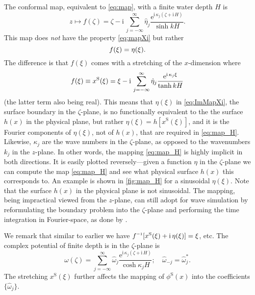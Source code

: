 \documentclass[a4paper,12pt]{article}
\newcommand{\mr}{\mathrm}
\renewcommand{\S}{^\mr{S}}
\newcommand{\ii}{\mr{i}\,}
\newcommand{\ee}{\mr{e}}
\renewcommand{\_}[1]{_\mr{#1}}
\let\Re\relax
\let\Im\relax
\DeclareMathOperator\Re{Re}
\DeclareMathOperator\Im{Im}
\newcommand{\h}{\hat}
\newcommand{\z}{z}
\newcommand{\x}{x}
\newcommand{\zz}{\zeta}
\newcommand{\xx}{\xi}
\newcommand{\kk}{\kappa}
\newcommand{\zmap}{f}
\newcommand{\zzmap}{\zmap^{\raisebox{.2ex}{$\scriptscriptstyle-1$}}}
\newcommand{\ww}{\omega}
\newcommand{\surf}{\eta}
\begin{document}
The conformal map, equivalent to \eqref{eq:map}, with a finite water depth $H$ is
\begin{equation}
z\mapsto \zmap(\zz) = \zz - \ii \sum_{j=-\infty}^\infty \h\eta_j \frac{\ee^{\ii \kk_j(\zz+\ii H)}}{\sinh kH}.
\label{eq:map_H}
\end{equation}
This map does \textit{not} have the property \eqref{eq:mapXi} but rather
\begin{equation}
\Im \zmap(\xx) = \surf(\xx).
\label{eq:ImMapXi}
\end{equation}
The difference is that $\zmap(\xx)$ comes with a stretching of the $x$-dimension where
\begin{equation}
\Re \zmap(\xx) \equiv x\S(\xx) = \xx -\ii  \sum_{j=-\infty}^\infty \h\eta_j \frac{\ee^{\ii \kk_j\xx}}{\tanh kH}
\label{eq:mapXi}
\end{equation}
(the latter term also being real).
This means that $\surf(\xx)$ in \eqref{eq:ImMapXi}, the surface boundary in the $\zz$-plane, is no functionally equivalent to the the surface $h(\x)$ in the physical plane, but rather
$\eta(\xx)=h[x\S(\xx)]$, and it is the Fourier components of $\eta(\xx)$, not of $h(\x)$, that are required in \eqref{eq:map_H}. 
Likewise, $\kk_j$ are the wave numbers in the $\zz$-plane, as opposed to the wavenumbers $k_j$ in the $\z$-plane.
In other words, the mapping \eqref{eq:map_H} is highly implicit in both directions.
It is easily plotted reversely---given a function $\eta$ in the $\zz$-plane we can compute the map \eqref{eq:map_H} and see what physical surface $h(x)$ this corresponds to.
An example is shown in \autoref{fig:map_H} for a sinusoidal $\eta(\xx)$. Note that the surface $h(x)$ in the physical plane is not sinusoidal.
The mapping, being impractical viewed from the $\z$-plane, can still adopt for wave simulation by reformulating the boundary problem into the $\zz$-plane and performing the time integration in Fourier-space, as done by \citet{chalikov2005modeling}.


We remark that similar to earlier we have $\zzmap[x\S(\xx)+\ii\eta(\xx)]=\xx$, etc.
The complex potential of finite depth is in the $\zz$-plane is
\begin{equation}
\ww(\zz) = \sum_{j=-\infty}^\infty\h\ww_j \frac{\ee^{\ii \kk_j(\zz+\ii H)}}{\cosh \kk_j H}; \quad \h\ww_{-j}=\h\ww_{j}^*.
\label{eq:wH}
\end{equation}
The stretching $x\S(\xx)$ further affects the mapping of $\phi\S(\x)$ into the coefficients $\{\h\ww_j\}$.
\end{document}
